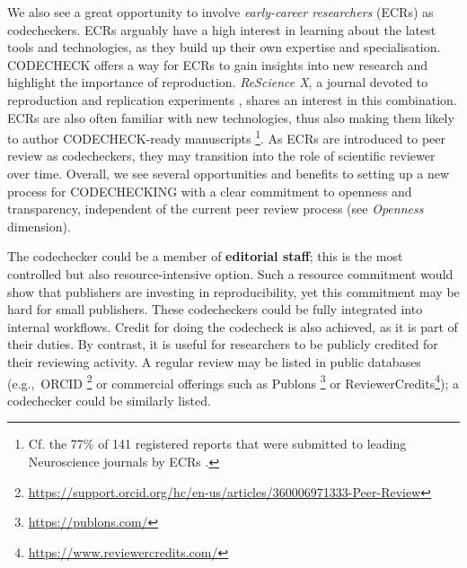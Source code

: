 \documentclass[12pt]{article}
\begin{document}
We also see a great opportunity to involve \emph{early-career researchers} (ECRs) as codecheckers.
ECRs arguably have a high interest in learning
about the latest tools and technologies, as they build up their own
expertise and specialisation.
CODECHECK offers a way for ECRs to gain insights into new research and
highlight the importance of reproduction.  
\emph{ReScience X}, a journal devoted to reproduction and replication experiments \cite{roesch_new_2020}, shares an interest in this combination.
ECRs are also often familiar with new technologies, thus also making them likely to author CODECHECK-ready manuscripts
\footnote{Cf. the 77\% of 141 registered reports that were submitted to leading Neuroscience journals by ECRs \cite{chambers_registered_2019}.}.
As ECRs are introduced to peer review as codecheckers, they may transition into the role of scientific reviewer over time.
Overall, we see several opportunities and benefits to setting up a new process for CODECHECKING with a clear commitment to openness and transparency, independent of the current peer review process (see \emph{Openness} dimension).

The codechecker could be a member of \textbf{editorial staff}; this is
the most controlled but also resource-intensive option.  Such a
resource commitment would show that publishers are investing in
reproducibility, yet this commitment may be hard for small publishers.
These codecheckers could be fully integrated into internal workflows.
Credit for doing the codecheck is also achieved, as it is part of
their duties.  By contrast, it is useful for researchers to be
publicly credited for their reviewing activity.  A regular review
may be listed in public databases (e.g.,~ORCID
\footnote{\href{https://support.orcid.org/hc/en-us/articles/360006971333-Peer-Review}{https://support.orcid.org/hc/en-us/articles/360006971333-Peer-Review}}
or commercial offerings such as Publons
\footnote{\href{https://publons.com/}{https://publons.com/}} or
ReviewerCredits\footnote{\href{https://www.reviewercredits.com/}{https://www.reviewercredits.com/}});
a codechecker could be similarly listed.
\end{document}
